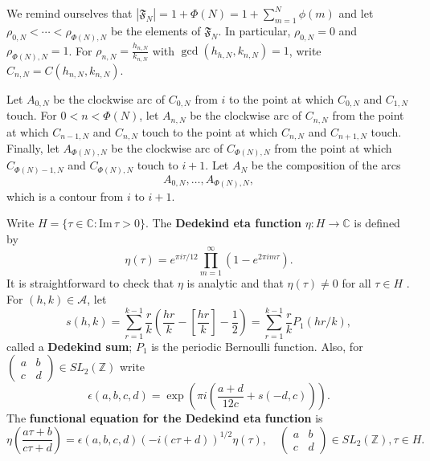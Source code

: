 \documentclass{article}
\def\Im{\ensuremath{\mathrm{Im}}\,}
\begin{document}
We remind ourselves that $|\mathfrak{F}_N|=1+\Phi(N) = 1+\sum_{m=1}^N \phi(m)$ and let
 $\rho_{0,N} <  \cdots < \rho_{\Phi(N),N}$ be the elements of $\mathfrak{F}_N$. In particular,
$\rho_{0,N}=0$ and $\rho_{\Phi(N),N}=1$.  For $\rho_{n,N} = \frac{h_{n,N}}{k_{n,N}}$ with
$\gcd(h_{h,N},k_{n,N})=1$,
write
$C_{n,N} = C(h_{n,N},k_{n,N})$. 

Let $A_{0,N}$ be the clockwise arc of $C_{0,N}$ from $i$ to the point at which $C_{0,N}$ and $C_{1,N}$ touch. 
For $0<n<\Phi(N)$, let $A_{n,N}$ be the clockwise arc of $C_{n,N}$ from the point at which $C_{n-1,N}$ and $C_{n,N}$ touch
to the point at which $C_{n,N}$ and $C_{n+1,N}$ touch. Finally, let $A_{\Phi(N),N}$ be the clockwise arc of $C_{\Phi(N),N}$ from the point at which
$C_{\Phi(N)-1,N}$ and $C_{\Phi(N),N}$ touch to $i+1$.
Let $A_N$ be the composition of the arcs
\begin{equation}
A_{0,N},\ldots,A_{\Phi(N),N},
\label{arc_composition}
\end{equation}
which is a contour from $i$ to $i+1$. 

Write $H = \{\tau \in \mathbb{C} : \Im \tau > 0\}$. 
The \textbf{Dedekind eta function} $\eta:H \to \mathbb{C}$ is defined by
\[
\eta(\tau) = e^{\pi i \tau/12} \prod_{m=1}^\infty (1-e^{2\pi im\tau}).
\]
It is straightforward to check that $\eta$ is analytic and that
$\eta(\tau) \neq 0$ for all $\tau \in H$ \cite[pp.~17--18, \S 1.44]{titchmarsh}. For 
$(h,k) \in \mathscr{A}$, let
\[
s(h,k) = \sum_{r=1}^{k-1} \frac{r}{k} \left( \frac{hr}{k} - \left[ \frac{hr}{k} \right] - \frac{1}{2}\right)
=\sum_{r=1}^{k-1} \frac{r}{k} P_1(hr/k),
\]
called a \textbf{Dedekind sum}; $P_1$ is the periodic Bernoulli function.
Also, for $\begin{pmatrix}a&b\\c&d\end{pmatrix} \in SL_2(\mathbb{Z})$ write
\[
\epsilon(a,b,c,d)  = \exp\left( \pi i\left(\frac{a+d}{12c} + s(-d,c)\right) \right).
\]
The \textbf{functional equation for the Dedekind eta function} \cite[p.~52, Theorem 3.4]{apostol} is 
\[
\eta\left( \frac{a\tau +b}{c\tau+d} \right) = \epsilon(a,b,c,d) (-i(c\tau+d))^{1/2} \eta(\tau),
\quad \begin{pmatrix}a&b\\c&d\end{pmatrix} \in SL_2(\mathbb{Z}), \tau \in H.
\]
\end{document}
